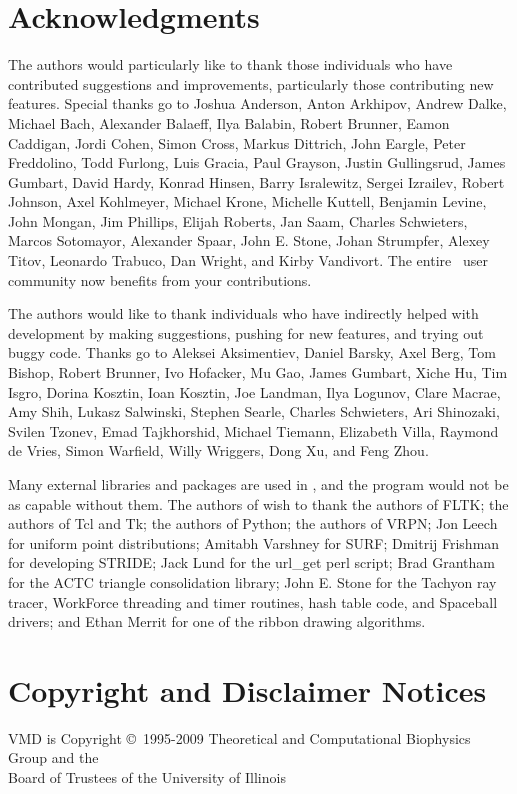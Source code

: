 \section{Acknowledgments}

The authors would particularly like to thank those individuals 
who have contributed suggestions and improvements, particularly 
those contributing new features.  Special thanks go to 
Joshua Anderson, Anton Arkhipov, Andrew Dalke, Michael Bach, 
Alexander Balaeff, Ilya Balabin, Robert Brunner,
Eamon Caddigan, Jordi Cohen, Simon Cross,
Markus Dittrich, John Eargle, 
Peter Freddolino, Todd Furlong, Luis Gracia, 
Paul Grayson, Justin Gullingsrud, James Gumbart,
David Hardy, Konrad Hinsen,
Barry Isralewitz, Sergei Izrailev, Robert Johnson,
Axel Kohlmeyer, Michael Krone, Michelle Kuttell, Benjamin Levine,
John Mongan, Jim Phillips, Elijah Roberts, Jan Saam, 
Charles Schwieters, Marcos Sotomayor, Alexander Spaar,
John E. Stone, Johan Strumpfer,
Alexey Titov, Leonardo Trabuco, Dan Wright, and Kirby Vandivort.
The entire \VMD\ user community now benefits from your contributions.

The authors would like to thank individuals
who have indirectly helped with development 
by making suggestions, pushing for new features, and trying out buggy code.  
Thanks go to 
Aleksei Aksimentiev, Daniel Barsky, Axel Berg, 
Tom Bishop, Robert Brunner, Ivo Hofacker, Mu Gao, 
James Gumbart, Xiche Hu, Tim Isgro, Dorina Kosztin, Ioan Kosztin, 
Joe Landman, Ilya Logunov, Clare Macrae, Amy Shih, 
Lukasz Salwinski, Stephen Searle, Charles Schwieters, 
Ari Shinozaki, Svilen Tzonev, Emad Tajkhorshid, Michael Tiemann, 
Elizabeth Villa, Raymond de Vries, Simon Warfield,
Willy Wriggers, Dong Xu, and Feng Zhou.  

Many external libraries and packages are used in \VMD, and the 
program would not be as capable without them.  
The authors of \VMD wish to thank
the authors of FLTK;
the authors of Tcl and Tk; 
the authors of Python; 
the authors of VRPN;
Jon Leech for uniform point distributions;
Amitabh Varshney for SURF;
Dmitrij Frishman for developing STRIDE; 
Jack Lund for the url\_get perl script; 
Brad Grantham for the ACTC triangle consolidation library;
John E. Stone for the Tachyon ray tracer, WorkForce threading and timer routines, hash table code, and Spaceball drivers;
and 
Ethan Merrit for one of the ribbon drawing algorithms. 


\section{Copyright and Disclaimer Notices}
\begin{center}
VMD is  Copyright \copyright\ 1995-2009 
Theoretical and Computational Biophysics Group and the \\
Board of Trustees of the University of Illinois
\end{center}


